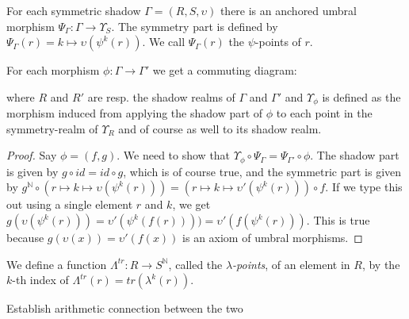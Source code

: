 \begin{propdef}
  For each symmetric shadow $\Gamma = (R, S, \upsilon)$ there is an anchored umbral morphism $\Psi_{\Gamma} : \Gamma \to \Upsilon_S$. The symmetry part is defined by $\Psi_{\Gamma}(r) = k \mapsto \upsilon(\psi^k(r))$. We call $\Psi_{\Gamma}(r)$ the $\psi$-points of $r$.
\end{propdef}

\begin{propdef} \label{propdef:upsilonUniversalDiagram}
  For each morphism $\phi : \Gamma \to \Gamma'$ we get a commuting diagram:
  \begin{center}
  \end{center}
  where $R$ and $R'$ are resp. the shadow realms of $\Gamma$ and $\Gamma'$ and $\Upsilon_{\phi}$ is defined as the morphism induced from applying the shadow part of $\phi$ to each point in the symmetry-realm of $\Upsilon_R$ and of course as well to its shadow realm.
\end{propdef}

\begin{proof}
  Say $\phi = (f, g)$. We need to show that $\Upsilon_{\phi} \circ \Psi_\Gamma = \Psi_{\Gamma'} \circ \phi$. The shadow part is given by $g \circ id = id \circ g$, which is of course true, and the symmetric part is given by $g^{\mathbb{N}} \circ (r \mapsto k \mapsto \upsilon(\psi^k(r))) = (r \mapsto k \mapsto \upsilon'(\psi^k(r))) \circ f$. If we type this out using a single element $r$ and $k$, we get $g(\upsilon(\psi^k(r))) = \upsilon'(\psi^k(f(r)))) = \upsilon'(f(\psi^k(r)))$. This is true because $g(\upsilon(x)) = \upsilon'(f(x))$ is an axiom of umbral morphisms. \qedhere
\end{proof}

\begin{definition}
    We define a function $\Lambda^{tr} : R \to S^{\mathbb{N}}$, called the \emph{$\lambda$-points}, of an element in $R$, by the $k$-th index of $\Lambda^{tr}(r) = tr(\lambda^k(r))$. 
\end{definition}

\begin{proposition} 
  Establish arithmetic connection between the two
\end{proposition}

